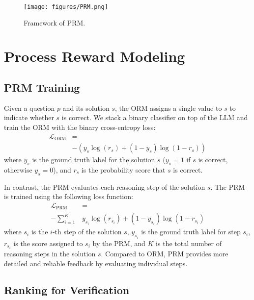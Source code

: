 
\begin{figure}[t]
    \centering
    \texttt{[image: figures/PRM.png]}
    \caption{Framework of PRM.}
    \label{fig:PRM}
\end{figure}


\section{Process Reward Modeling}
\label{sec:prm}

\subsection{PRM Training}

Given a question $p$ and its solution $s$, the ORM assigns a single value to $s$ to indicate whether $s$ is correct. 
We stack a binary classifier on top of the LLM and train the ORM with the binary cross-entropy loss:
\begin{equation}
\begin{aligned}
    \mathcal{L}_{\text{ORM}}& = \\
    & -{(y_s \log(r_s) + (1 - y_s)\log(1 - r_s))}
\end{aligned}
\end{equation}
where $y_s$ is the ground truth label for the solution $s$ ($y_s = 1$ if $s$ is correct, otherwise $y_s = 0$), and $r_s$ is the probability score that $s$ is correct.


In contrast, the PRM evaluates each reasoning step of the solution $s$. The PRM is trained using the following loss function:
\begin{equation}
\begin{aligned}
    \mathcal{L}_{\text{PRM}} & = \\
    -\sum_{i=1}^{K}& y_{s_i}\log(r_{s_i}) + (1 - y_{s_i})\log(1 - r_{s_i})
\end{aligned}
\end{equation}
where $s_i$ is the $i$-th step of the solution $s$, $y_{s_i}$ is the ground truth label for step $s_i$, $r_{s_i}$ is the score assigned to $s_i$ by the PRM, and $K$ is the total number of reasoning steps in the solution $s$. Compared to ORM, PRM provides more detailed and reliable feedback by evaluating individual steps.

\subsection{Ranking for Verification}
\label{sec:prm_verify}


